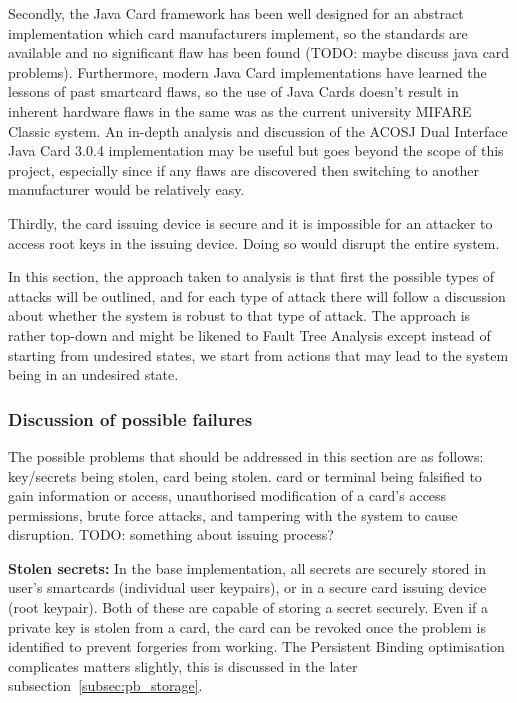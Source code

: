 \documentclass[12pt]{article}
\begin{document}
Secondly, the Java Card framework has been well designed for an abstract implementation which card manufacturers implement, so the standards are available and no significant flaw has been found (TODO: maybe discuss java card problems). Furthermore, modern Java Card implementations have learned the lessons of past smartcard flaws, so the use of Java Cards doesn't result in inherent hardware flaws in the same was as the current university MIFARE Classic system. An in-depth analysis and discussion of the ACOSJ Dual Interface Java Card 3.0.4 implementation may be useful but goes beyond the scope of this project, especially since if any flaws are discovered then switching to another manufacturer would be relatively easy.

Thirdly, the card issuing device is secure and it is impossible for an attacker to access root keys in the issuing device. Doing so would disrupt the entire system.

In this section, the approach taken to analysis is that first the possible types of attacks will be outlined, and for each type of attack there will follow a discussion about whether the system is robust to that type of attack. The approach is rather top-down and might be likened to Fault Tree Analysis except instead of starting from undesired states, we start from actions that may lead to the system being in an undesired state.

\subsubsection{Discussion of possible failures}

The possible problems that should be addressed in this section are as follows: key/secrets being stolen, card being stolen. card or terminal being falsified to gain information or access, unauthorised modification of a card's access permissions, brute force attacks, and tampering with the system to cause disruption. TODO: something about issuing process?

\textbf{Stolen secrets:} In the base implementation, all secrets are securely stored in user's smartcards (individual user keypairs), or in a secure card issuing device (root keypair). Both of these are capable of storing a secret securely. Even if a private key is stolen from a card, the card can be revoked once the problem is identified to prevent forgeries from working. The Persistent Binding optimisation complicates matters slightly, this is discussed in the later subsection~\ref{subsec:pb_storage}.
\end{document}

